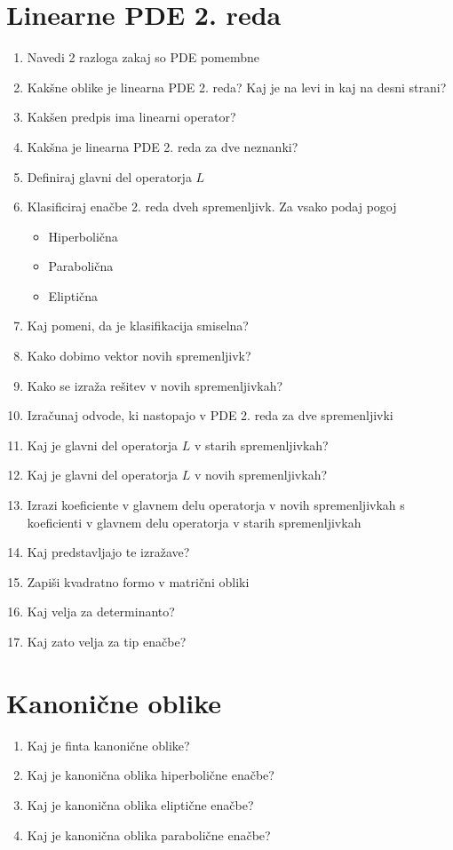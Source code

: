 \documentclass{article}
\begin{document}
    \section{Linearne PDE 2. reda}
    \begin{enumerate}
        \item Navedi 2 razloga zakaj so PDE pomembne
        \item Kakšne oblike je linearna PDE 2. reda? Kaj je na levi in kaj na desni strani?
        \item Kakšen predpis ima linearni operator?
        \item Kakšna je linearna PDE 2. reda za dve neznanki?
        \item Definiraj glavni del operatorja $L$
        \item Klasificiraj enačbe 2. reda dveh spremenljivk. Za vsako podaj pogoj
        \begin{itemize}
            \item Hiperbolična
            \item Parabolična
            \item Eliptična
        \end{itemize}
        \item Kaj pomeni, da je klasifikacija smiselna?
        \item Kako dobimo vektor novih spremenljivk?
        \item Kako se izraža rešitev v novih spremenljivkah?
        \item Izračunaj odvode, ki nastopajo v PDE 2. reda za dve spremenljivki
        \item Kaj je glavni del operatorja $L$ v starih spremenljivkah?
        \item Kaj je glavni del operatorja $L$ v novih spremenljivkah?
        \item Izrazi koeficiente v glavnem delu operatorja v novih spremenljivkah s koeficienti v glavnem delu operatorja v starih spremenljivkah
        \item Kaj predstavljajo te izražave?
        \item Zapiši kvadratno formo v matrični obliki
        \item Kaj velja za determinanto?
        \item Kaj zato velja za tip enačbe?
    \end{enumerate}

    \section{Kanonične oblike}
    \begin{enumerate}
        \item Kaj je finta kanonične oblike?
        \item Kaj je kanonična oblika hiperbolične enačbe?
        \item Kaj je kanonična oblika eliptične enačbe?
        \item Kaj je kanonična oblika parabolične enačbe?
    \end{enumerate}
\end{document}

